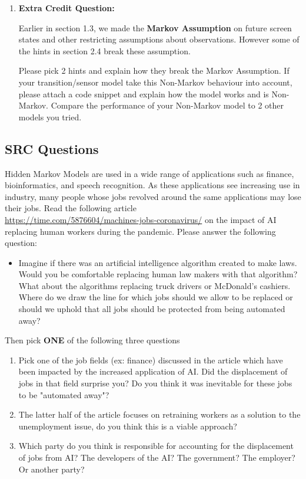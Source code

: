 \documentclass{article}
\begin{document}
\begin{enumerate}
\item \textbf{Extra Credit Question:}

Earlier in section 1.3, we made the \textbf{Markov Assumption} on future screen states and other restricting assumptions about observations. However some of the hints in section 2.4 break these assumption.

Please pick 2 hints and explain how they break the Markov Assumption. If your transition/sensor model take this Non-Markov behaviour into account, please attach a code snippet and explain how the model works and is Non-Markov. Compare the performance of your Non-Markov model to 2 other models you tried. 

\end{enumerate}

\subsection{SRC Questions}
Hidden Markov Models are used in a wide range of applications such as finance, bioinformatics, and speech recognition. As these applications see increasing use in industry, many people whose jobs revolved around the same applications may lose their jobs. Read the following article \\\url{https://time.com/5876604/machines-jobs-coronavirus/}
on the impact of AI replacing human workers during the pandemic. Please answer the following question:
\begin{itemize}
     \item Imagine if there was an artificial intelligence algorithm created to make laws. Would you be comfortable replacing human law makers with that algorithm? What about the algorithms replacing truck drivers or McDonald's cashiers. Where do we draw the line for which jobs should we allow to be replaced or should we uphold that all jobs should be protected from being automated away?
\end{itemize}
Then pick \textbf{ONE} of the following three questions
\begin{enumerate}
    \item Pick one of the job fields (ex: finance) discussed in the article which have been impacted by the increased application of AI. Did the displacement of jobs in that field surprise you? Do you think it was inevitable for these jobs to be "automated away"?
    \item The latter half of the article focuses on retraining workers as a solution to the unemployment issue, do you think this is a viable approach?
    \item Which party do you think is responsible for accounting for the displacement of jobs from AI? The developers of the AI? The government? The employer? Or another party?
\end{enumerate}
\end{document}
